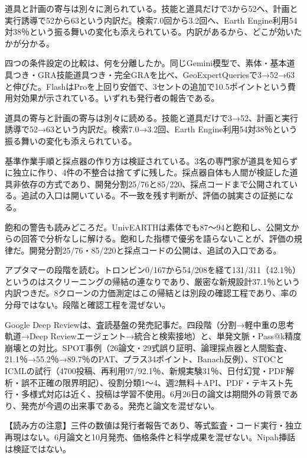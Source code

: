 \documentclass[lualatex,a4paper,10pt]{jlreq}
\begin{document}
道具と計画の寄与は別々に測られている。技能と道具だけで3から52へ、計画と実行誘導で52から63という内訳だ。検索7.0回から3.2回へ、Earth Engine利用54対38％という振る舞いの変化も添えられている。内訳があるから、どこが効いたかが分かる。
\cite{B47,B48}


四つの条件設定の比較は、何を分離したか。同じGemini模型で、素体・基本道具つき・GRA技能道具つき・完全GRAを比べ、GeoExpertQueriesで3→52→63と伸びた。FlashはProを上回り安価で、3セントの追加で10.5ポイントという費用対効果が示されている。いずれも発行者の報告である。
\cite{B47,B48}


道具の寄与と計画の寄与は別々に読める。技能と道具だけで3→52、計画と実行誘導で52→63という内訳だ。検索7.0→3.2回、Earth Engine利用54対38％という振る舞いの変化も添えられている。
\cite{B47,B48}


基準作業手順と採点器の作り方は検証されている。3名の専門家が道具を知らずに独立に作り、4件の不整合は捨てずに残した。採点器自体も人間が検証した道具非依存の方式であり、開発分割25/76と85/220、採点コードまで公開されている。追試の入口は開いている。不一致を残す判断が、評価の誠実さの証拠になる。
\cite{B47,B48}


飽和の警告も読みどころだ。UnivEARTHは素体でも87〜94と飽和し、公開文からの回答で分析なしに解ける。飽和した指標で優劣を語らないことが、評価の規律だ。開発分割25/76・85/220と採点コードの公開は、追試の入口である。
\cite{B47,B48}


アプタマーの段階を読む。トロンビン0/167から54/208を経て131/311（42.1％）というのはスクリーニングの帰結の連なりであり、厳密な新規設計37.1％という内訳つきだ。8クローンの力価測定はこの帰結とは別段の確認工程であり、率の分母ではない。段階と確認工程を混ぜない。
\cite{B43,B44,B45,B46}


Google Deep Reviewは、査読基盤の発売記事だ。四段階（分割→軽中重の思考軌道→Deep Reviewエージェント→統合と検索接地）と、単発文脈・Pass@k精度崩壊との対比。SPOT事例（26論文・29式誤り証明、論理採点器と人間監査、21.1％→55.2％→89.7％のPAT、プラス34ポイント、Banach反例）、STOCとICMLの試行（4700投稿、再利用97/92.1％、新規実験31％、日付幻覚・PDF解析・誤不正確の限界明記）、役割分類1〜4、週2無料＋API、PDF・テキスト先行・多様式対応は近く、投稿は学習不使用。6月26日の論文は期間外の背景であり、発売が今週の出来事である。発売と論文を混ぜない。
\cite{B49,B50}


\begin{tcolorbox}[colback=SurveySoft,colframe=SurveyRule,arc=1mm,boxrule=0.4pt,left=2mm,right=2mm]
【読み方の注意】三件の数値は発行者報告であり、等式監査・コード実行・独立再現はない。6月論文と10月発売、価格条件と科学成果を混ぜない。Nipah挿話は検証ではない。
\end{tcolorbox}
\cite{B49,B47,B51,B52,B50,B43,B48,B44,B45,B46}
\end{document}
